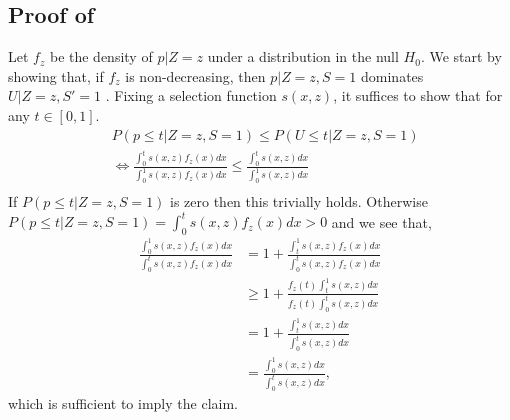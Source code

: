 \documentclass{article}
\begin{document}
\begin{appendix}
\subsection{Proof of }
Let $f_z$ be the density of $p |Z=z$ under a distribution in the null $H_0$. We start by showing that, if $f_z$ is non-decreasing, then $p |Z =z, S =1$ dominates $U |Z=z, S'=1$ . Fixing a selection function $s(x, z)$, it suffices to show that for any $t \in [0, 1]$. 
    \begin{align*}
        &P(p \leq t | Z=z, S =1) \leq P(U \leq t |Z=z, S= 1)\\
        &\iff 
        \frac{\int_{0}^{t} s(x, z) f_z(x) dx }{\int_{0}^{1} s(x, z) f_z(x) dx } \leq \frac{\int_{0}^{t} s(x, z) dx}{\int_{0}^{1} s(x, z) dx } \\
    \end{align*}
If $P( p \leq t | Z=z, S = 1)$ is zero then this trivially holds. Otherwise $P( p \leq t | Z=z, S = 1) = \int_{0}^{t} s(x, z) f_z(x) dx  > 0$ and we see that, 
    \begin{align*}
        \frac{ \int_{0}^{1} s(x, z) f_z(x) dx }{\int_{0}^{t} s(x, z) f_z(x) dx } &= 1 + \frac{\int_{t}^{1} s(x, z) f_z(x) dx }{\int_{0}^{t} s(x, z) f_z(x) dx }\\
        &\geq 1 + \frac{f_z(t)\int_{t}^{1} s(x ,z) dx }{f_z(t)\int_{0}^{t} s(x, z)  dx }\\
        &= 1 + \frac{\int_{t}^{1} s(x, z) dx }{\int_{0}^{t} s(x, z)  dx }\\
        &= \frac{ \int_{0}^{1} s(x, z) dx }{\int_{0}^{t} s(x, z)  dx },
    \end{align*}
which is sufficient to imply the claim. 


\end{appendix}
\end{document}
